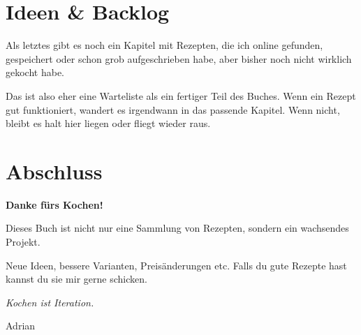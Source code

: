 \documentclass[
a4paper,
11pt
]{article}
\begin{document}

\section{Ideen \& Backlog}

Als letztes gibt es noch ein Kapitel mit Rezepten, die ich online gefunden, gespeichert oder schon grob aufgeschrieben habe, aber bisher noch nicht wirklich gekocht habe.

Das ist also eher eine Warteliste als ein fertiger Teil des Buches. Wenn ein Rezept gut funktioniert, wandert es irgendwann in das passende Kapitel. Wenn nicht, bleibt es halt hier liegen oder fliegt wieder raus.

\mylocaltableofcontents%
\newpage








\clearpage
\section{Abschluss}

\begin{center}
\vspace{2cm}

{\Huge \textbf{Danke fürs Kochen!}}

\vspace{1cm}

Dieses Buch ist nicht nur eine Sammlung von Rezepten,  
sondern ein wachsendes Projekt.

\vspace{0.5cm}

Neue Ideen, bessere Varianten, Preisänderungen etc. Falls du gute Rezepte hast kannst du sie mir gerne schicken.

\vspace{1cm}

\textit{Kochen ist Iteration.}

\vfill

\Large
Adrian\\
\the\year%
\end{center}
\clearpage



\printindex
\end{document}
